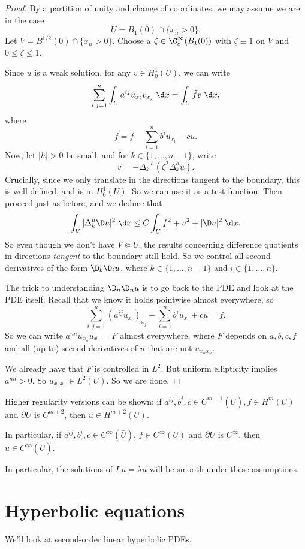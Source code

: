\documentclass[a4paper]{article}
\begin{document}
\begin{proof}
  By a partition of unity and change of coordinates, we may assume we are in the case
  \[
    U = B_1(0) \cap \{x_n > 0\}.
  \]
  Let $V = B^{1/2}(0) \cap \{x_n > 0\}$. Choose a $\zeta \in \C_c^\infty(B_1(0))$ with $\zeta \equiv 1$ on $V$ and $0 \leq \zeta \leq 1$.

  Since $u$ is a weak solution, for any $v \in H_0^1(U)$, we can write
  \[
    \sum_{i, j = 1}^n \int_U a^{ij} u_{x_i} v_{x_j}\;\d x = \int_U \tilde{f} v\;\d x,
  \]
  where
  \[
    \tilde{f} = f - \sum_{i = 1}^n b^i u_{x_i} - cu.
  \]
  Now, let $|h| > 0$ be small, and for $k \in \{1, \ldots, n - 1\}$, write
  \[
    v = - \Delta_k^{-h} (\zeta^2 \Delta^h_k u).
  \]
  Crucially, since we only translate in the directions tangent to the boundary, this is well-defined, and is in $H_0^1(U)$. So we can use it as a test function. Then proceed just as before, and we deduce that
  \[
    \int_V |\Delta^h_k \D u|^2 \;\d x \leq C \int_U f^2 + u^2 + |\D u|^2\;\d x.
  \]
  So even though we don't have $V \Subset U$, the results concerning difference quotients in directions \emph{tangent} to the boundary still hold. So we control all second derivatives of the form $\D_k \D_i u$, where $k \in \{1, \ldots, n - 1\}$ and $i \in \{1, \ldots, n\}$.

  The trick to understanding $\D_n \D_n u$ is to go back to the PDE and look at the PDE itself. Recall that we know it holds pointwise almost everywhere, so
  \[
    \sum_{i, j = 1}^n (a^{ij} u_{x_i})_{x_j} + \sum_{i = 1}^n b^i u_{x_i} + cu = f.
  \]
  So we can write $a^{nn} u_{x_n} u_{x_n} = F$ almost everywhere, where $F$ depends on $a, b, c, f$ and all (up to) second derivatives of $u$ that are not $u_{x_n x_n}$.

  We already have that $F$ is controlled in $L^2$. But uniform ellipticity implies $a^{nn} > 0$. So $u_{x_n x_n} \in L^2(U)$. So we are done.
\end{proof}
Higher regularity versions can be shown: if $a^{ij}, b^i, c \in C^{m + 1}(\bar{U}), f \in H^m(U)$ and $\partial U$ is $C^{m + 2}$, then $u \in H^{m + 2}(U)$.

In particular, if $a^{ij}, b^i, c \in C^\infty(\bar{U})$, $f \in C^\infty(U)$ and $\partial U$ is $C^\infty$, then $u \in C^\infty(\bar{U})$.

In particular, the solutions of $Lu = \lambda u$ will be smooth under these assumptions.

\section{Hyperbolic equations}
We'll look at second-order linear hyperbolic PDEs.
\end{document}
